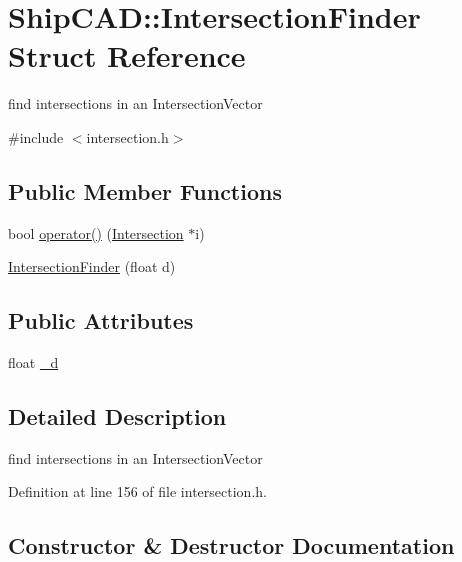 \hypertarget{structShipCAD_1_1IntersectionFinder}{}\section{Ship\+C\+AD\+:\+:Intersection\+Finder Struct Reference}
\label{structShipCAD_1_1IntersectionFinder}


find intersections in an Intersection\+Vector  




{\ttfamily \#include $<$intersection.\+h$>$}

\subsection*{Public Member Functions}
\begin{DoxyCompactItemize}
\item 
bool \hyperlink{structShipCAD_1_1IntersectionFinder_a7b3611a20a76f5c32169aa35350549a7}{operator()} (\hyperlink{classShipCAD_1_1Intersection}{Intersection} $\ast$i)
\item 
\hyperlink{structShipCAD_1_1IntersectionFinder_a9208cde01b362db91b0860b17dae4dd4}{Intersection\+Finder} (float d)
\end{DoxyCompactItemize}
\subsection*{Public Attributes}
\begin{DoxyCompactItemize}
\item 
float \hyperlink{structShipCAD_1_1IntersectionFinder_a3155359937831f04d1f44ad660463f30}{\+\_\+d}
\end{DoxyCompactItemize}


\subsection{Detailed Description}
find intersections in an Intersection\+Vector 

Definition at line 156 of file intersection.\+h.



\subsection{Constructor \& Destructor Documentation}
